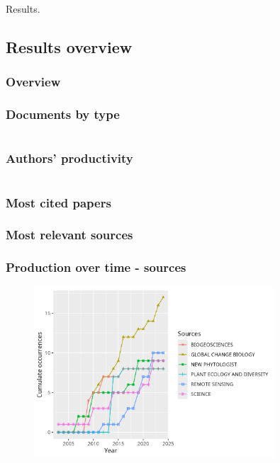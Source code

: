 \documentclass[aspectratio=169]{beamer}
\begin{document}
\begin{frame}
    Results.
\end{frame}


\subsection{Results overview}


\begin{frame}
	\frametitle{Overview}
	\centering
	\small
	
\end{frame}

\begin{frame}
	\frametitle{Documents by type}
	\centering
	\small
	
\end{frame}

\begin{frame}
	\begin{columns}
		\begin{column}{0.5\textwidth}
			\frametitle{Authors' productivity}
			\centering
			\small
			
		\end{column}
		\begin{column}{0.5\textwidth}
			\centering
			\small
			
		\end{column}
	\end{columns}
\end{frame}

\begin{frame}
	\frametitle{Most cited papers}
	\centering
	\small
	
\end{frame}

\begin{frame}
	\frametitle{Most relevant sources}
	\centering
	\scriptsize
	
\end{frame}

\begin{frame}
	\frametitle{Production over time - sources}
	\begin{figure}
		\centering
		\includegraphics[width=0.8\textwidth]
        {figures/sources_production_over_time.png}
	\end{figure}
\end{frame}
\end{document}
